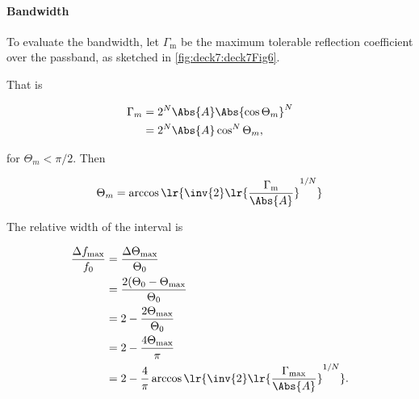 \paragraph{Bandwidth}

To evaluate the bandwidth, let \( \Gamma_{\mathrm{m}} \) be the maximum tolerable reflection coefficient over the passband, as sketched in \cref{fig:deck7:deck7Fig6}.


That is

\begin{equation}\label{eqn:uwavesDeck7MultisectionTransformersCore:400}
\begin{aligned}
\Gamma_m
&= 2^N \Abs{A} \Abs{\cos \Theta_m }^N
\\ &= 2^N \Abs{A} \cos^N \Theta_m,
\end{aligned}
\end{equation}

for \( \Theta_m < \pi/2 \).  Then

\begin{equation}\label{eqn:uwavesDeck7MultisectionTransformersCore:420}
\Theta_m = \arccos\lr{ \inv{2} \lr{ \frac{\Gamma_{\mathrm{m}}}{\Abs{A}}}^{1/N} }
\end{equation}

The relative width of the interval is

\begin{equation}\label{eqn:uwavesDeck7MultisectionTransformersCore:440}
\begin{aligned}
\frac{\Delta f_{\mathrm{max}}}{f_0}
&=
\frac{\Delta \Theta_{\mathrm{max}}}{\Theta_0}
\\ &=
\frac{2 (\Theta_0 - \Theta_{\mathrm{max}}}{\Theta_0}
\\ &=
2 - \frac{2 \Theta_{\mathrm{max}}}{\Theta_0}
\\ &=
2 - \frac{4 \Theta_{\mathrm{max}}}{\pi}
\\ &=
2 - \frac{4 }{\pi} \arccos\lr{ \inv{2} \lr{ \frac{\Gamma_{\mathrm{max}}}{\Abs{A}}}^{1/N} }.
\end{aligned}
\end{equation}

